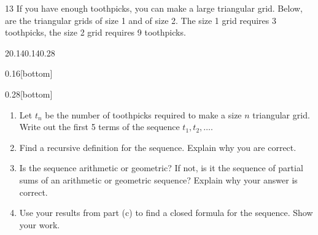 \documentclass[11pt,]{book}
\theoremstyle{ptxplainnotitle}
\theoremstyle{ptxplaintitle}
\theoremstyle{ptxdefinitionnotitle}
\theoremstyle{ptxdefinitiontitle}
\theoremstyle{ptxdefinitionnotitle}
\theoremstyle{ptxdefinitiontitle}
\theoremstyle{ptxdefinitionnotitle}
\theoremstyle{ptxdefinitiontitle}
\theoremstyle{ptxdefinitiontitlenonumber}
\theoremstyle{ptxdefinitiontitlenonumber}
\numberwithin{equation}{chapter}
\begin{document}
\begin{divisionexercise}{13}\hypertarget{exercise-25}{}
\hypertarget{p-337}{}%
If you have enough toothpicks, you can make a large triangular grid. Below, are the triangular grids of size 1 and of size 2. The size 1 grid requires 3 toothpicks, the size 2 grid requires 9 toothpicks.%
\begin{sidebyside}{2}{0.14}{0.14}{0.28}
\begin{sbspanel}{0.16}[bottom]
\end{sbspanel}
\begin{sbspanel}{0.28}[bottom]
\end{sbspanel}
\end{sidebyside}
\par
\hypertarget{p-338}{}%
\leavevmode%
\begin{enumerate}[label=(\alph*)]
\item\hypertarget{li-175}{}\hypertarget{p-339}{}%
Let \(t_n\) be the number of toothpicks required to make a size \(n\) triangular grid. Write out the first 5 terms of the sequence \(t_1, t_2, \ldots\). %
\item\hypertarget{li-176}{}\hypertarget{p-340}{}%
Find a recursive definition for the sequence. Explain why you are correct. %
\item\hypertarget{li-177}{}\hypertarget{p-341}{}%
Is the sequence arithmetic or geometric? If not, is it the sequence of partial sums of an arithmetic or geometric sequence? Explain why your answer is correct. %
\item\hypertarget{li-178}{}\hypertarget{p-342}{}%
Use your results from part (c) to find a closed formula for the sequence. Show your work. %
\end{enumerate}
%
\end{divisionexercise}%
\end{document}
